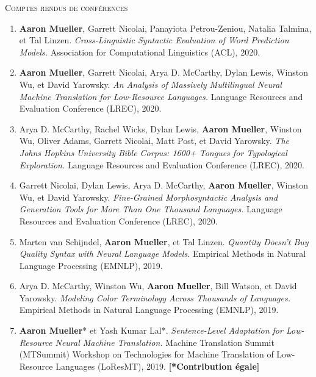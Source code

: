 \documentclass[10pt]{article}
\begin{document}
	\textsc{Comptes rendus de conférences}
	\begin{enumerate}[leftmargin=*, topsep=0pt, itemsep=-1ex, partopsep=0ex, parsep=1ex]

	\item \textbf{Aaron Mueller}, Garrett Nicolai, Panayiota Petrou-Zeniou, Natalia Talmina, et Tal Linzen. \emph{Cross-Linguistic Syntactic Evaluation of Word Prediction Models.} Association for Computational Linguistics (ACL), 2020.

	\item \textbf{Aaron Mueller}, Garrett Nicolai, Arya D. McCarthy, Dylan Lewis, Winston Wu, et David Yarowsky. \emph{An Analysis of Massively Multilingual Neural Machine Translation for Low-Resource Languages.} Language Resources and Evaluation Conference (LREC), 2020.

	\item Arya D. McCarthy, Rachel Wicks, Dylan Lewis, \textbf{Aaron Mueller}, Winston Wu, Oliver Adams, Garrett Nicolai, Matt Post, et David Yarowsky. \emph{The Johns Hopkins University Bible Corpus: 1600+ Tongues for Typological Exploration.} Language Resources and Evaluation Conference (LREC), 2020.

	\item Garrett Nicolai, Dylan Lewis, Arya D. McCarthy, \textbf{Aaron Mueller}, Winston Wu, et David Yarowsky. \emph{Fine-Grained Morphosyntactic Analysis and Generation Tools for More Than One Thousand Languages.} Language Resources and Evaluation Conference (LREC), 2020.

	\item Marten van Schijndel, \textbf{Aaron Mueller}, et Tal Linzen. \emph{Quantity Doesn't Buy Quality Syntax with Neural Language Models.} Empirical Methods in Natural Language Processing (EMNLP), 2019.

	\item Arya D. McCarthy, Winston Wu, \textbf{Aaron Mueller}, Bill Watson, et David Yarowsky. \emph{Modeling Color Terminology Across Thousands of Languages.} Empirical Methods in Natural Language Processing (EMNLP), 2019.

	\item \textbf{Aaron Mueller}* et Yash Kumar Lal*. \emph{Sentence-Level Adaptation for Low-Resource Neural Machine Translation.} Machine Translation Summit (MTSummit) Workshop on Technologies for Machine Translation of Low-Resource Languages (LoResMT), 2019. \textbf{[*Contribution égale]}
	\end{enumerate}
\end{document}
